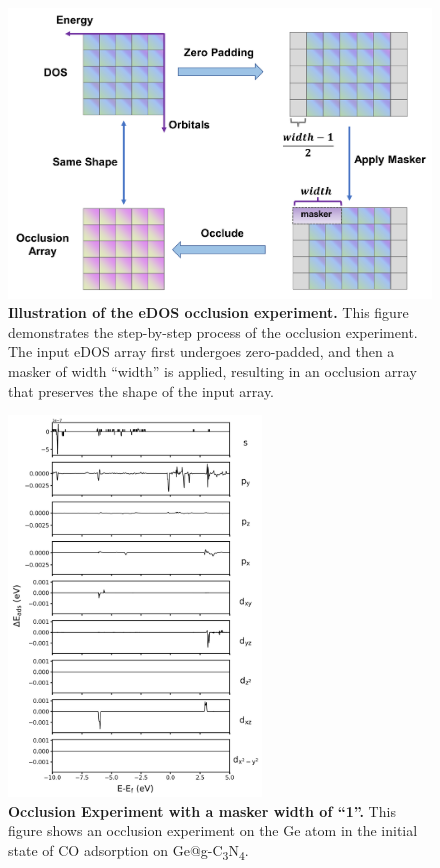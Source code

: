 \documentclass[a4paper, 12pt]{article}
\begin{document}
\begin{figure}[htbp]
  \centering
  \includegraphics[width=\textwidth]{supp_fig21_occlusion.png}
  \caption{\textbf{Illustration of the eDOS occlusion experiment.}
  This figure demonstrates the step-by-step process of the occlusion experiment.
  The input eDOS array first undergoes zero-padded, and then a masker of width ``width'' is applied,
  resulting in an occlusion array that preserves the shape of the input array.}
  \label{supp_fig21:occlusion}
\end{figure}

\begin{figure}[htbp]
  \centering
  \includegraphics[width=0.6\textwidth]{supp_fig22_occl_wid1.png}
  \caption{\textbf{Occlusion Experiment with a masker width of ``1''.}
  This figure shows an occlusion experiment on the Ge atom in
  the initial state of CO adsorption on Ge@g-C\textsubscript{3}N\textsubscript{4}.}
  \label{supp_fig22:occl_wid1}
\end{figure}
\end{document}
